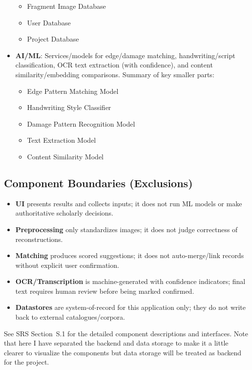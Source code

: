\documentclass{article}
\begin{document}
\begin{itemize}
\begin{itemize}
    \item Fragment Image Database
    \item User Database
    \item Project Database
   \end{itemize}
  \item \textbf{AI/ML}: Services/models for edge/damage matching, handwriting/script classification, OCR text extraction (with confidence), and content similarity/embedding comparisons. Summary of key smaller parts:
  \begin{itemize}
    \item Edge Pattern Matching Model
    \item Handwriting Style Classifier
    \item Damage Pattern Recognition Model
    \item Text Extraction Model
    \item Content Similarity Model
   \end{itemize}
\end{itemize}

\subsection*{Component Boundaries (Exclusions)}
\begin{itemize}
  \item \textbf{UI} presents results and collects inputs; it does not run ML models or make authoritative scholarly decisions.
  \item \textbf{Preprocessing} only standardizes images; it does not judge correctness of reconstructions.
  \item \textbf{Matching} produces scored suggestions; it does not auto-merge/link records without explicit user confirmation.
  \item \textbf{OCR/Transcription} is machine-generated with confidence indicators; final text requires human review before being marked confirmed.
  \item \textbf{Datastores} are system-of-record for this application only; they do not write back to external catalogues/corpora.
\end{itemize}

See SRS Section~S.1 for the detailed component descriptions and interfaces. Note that here I have separated the backend and data storage to make it a little clearer to visualize the components but data storage will be treated as backend for the project.
\end{document}
